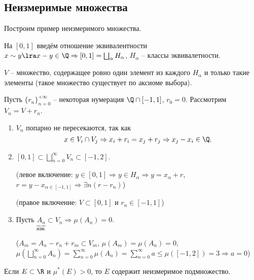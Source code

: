 \subsection{Неизмеримые множества}

Построим пример неизмеримого множества.

\begin{example}
    На $[0, 1]$ введём отношение эквивалентности $x \sim y \lra x - y \in \Q \Rightarrow [0, 1] = \bigsqcup_{\alpha}H_{\alpha}$, $H_{\alpha}$ -- классы эквивалетности.

    $V$ -- множество, содержащее ровно один элемент из каждого $H_{\alpha}$ и только такие элементы (такое множество существует по аксиоме выбора).

    Пусть $\{r_{n}\}_{n = 0}^{+\infty}$ -- некоторая нумерация $\Q \cap [-1, 1]$, $r_{0} = 0$. Рассмотрим $V_{n} = V + r_{n}$.
    \begin{enumerate}
        \item $V_{n}$ попарно не пересекаются, так как
        \[x \in V_{i} \cap V_{j} \Rightarrow x_{i} + r_{i} = x_{j} + r_{j} \Rightarrow x_{j} - x_{i} \in \Q.\]
        
        \item $[0, 1] \subset \bigsqcup_{n = 0}^{\infty}V_{n} \subset [-1, 2]$.
        
        (левое включение: $y \in [0, 1] \Rightarrow y \in H_{\alpha} \Rightarrow y = x_{\alpha} + r$, $r = y - x_{\alpha \in [-1, 1]} \Rightarrow \exists n (r - r_{n})$)

        (правое включение: $V \subset [0, 1]$ и $r_{n} \in [-1, 1]$)
        
        \item Пусть $\underbrace{A_{n}}_{\text{изм.}} \subset V_{n} \Rightarrow \mu(A_{n}) = 0$.

        ($A_{m} = A_{n} - r_{n} + r_{m} \subset V_{m}$, $\mu(A_{m}) = \mu(A_{n}) = 0$, $\mu(\bigsqcup_{n = 0}^{\infty}A_{n}) = \sum_{n = 0}^{\infty}\mu(A_{n}) = \sum_{n = 0}^{\infty}a \leq \mu([-1, 2]) = 3 \Rightarrow a = 0$)
    \end{enumerate}
\end{example}

\begin{theorem}
    Если $E \subset \R$ и $\mu^{*}(E) > 0$, то $E$ содержит неизмеримое подмножество.
\end{theorem}

